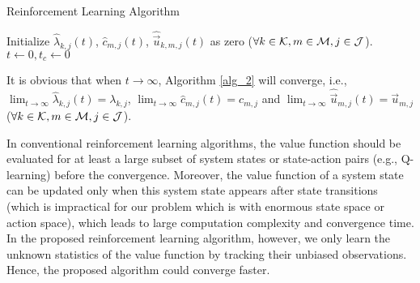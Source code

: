 \begin{algorithm}[ht]
    \caption{Reinforcement Learning Algorithm}\label{alg_2}
    \DontPrintSemicolon
    Initialize $\hat{\lambda}_{k,j}(t)$, $\hat{c}_{m,j}(t)$, $\hat{\vec{u}}_{k,m,j}(t)$ as zero ($\forall k\in\mathcal{K},m\in\mathcal{M},j\in\mathcal{J}$).\;
    $t \gets 0, t_c \gets 0$\;
\end{algorithm}

It is obvious that when $t\to\infty$, Algorithm \ref{alg_2} will converge, i.e., $\lim_{t\to\infty} \hat{\lambda}_{k,j}(t) = {\lambda}_{k,j}$, $\lim_{t\to\infty} \hat{c}_{m,j}(t) = {c}_{m,j}$ and $\lim_{t\to\infty} \hat{\vec{u}}_{m,j}(t) = \vec{u}_{m,j}$ ($\forall k\in\mathcal{K},m\in\mathcal{M},j\in\mathcal{J}$).

\begin{remark}
    In conventional reinforcement learning algorithms, the value function should be evaluated for at least a large subset of system states or state-action pairs (e.g., Q-learning) before the convergence.
    Moreover, the value function of a system state can be updated only when this system state appears after state transitions (which is impractical for our problem which is with enormous state space or action space), which leads to large computation complexity and convergence time.
    In the proposed reinforcement learning algorithm, however, we only learn the unknown statistics of the value function by tracking their unbiased observations.
    Hence, the proposed algorithm could converge faster.
\end{remark}



